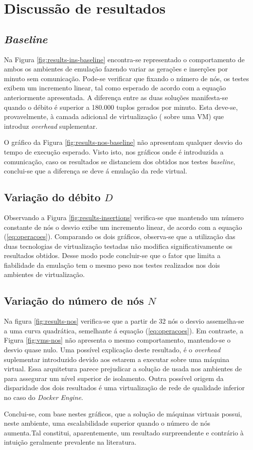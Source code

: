 
\section{Discussão de resultados}
\subsection{\emph{Baseline}}

Na Figura \ref{fig:results-ins-baseline} encontra-se representado o comportamento de ambos os ambientes de emulação fazendo variar as gerações e inserções por minuto sem comunicação. Pode-se verificar que fixando o número de nós, os testes exibem um incremento linear, tal como esperado de acordo com a equação anteriormente apresentada. A diferença entre as duas soluções manifesta-se quando o débito é superior a 180.000 tuplos gerados por minuto. Esta deve-se, provavelmente, à camada adicional de virtualização ({\conts} sobre uma VM) que introduz \textit{overhead} suplementar.

O gráfico da Figura \ref{fig:results-nos-baseline} não apresentam qualquer desvio do tempo de execução esperado. Visto isto, nos gráficos onde é introduzida a comunicação, caso os resultados se distanciem dos obtidos nos testes \textit{baseline}, conclui-se que a diferença se deve á emulação da rede virtual.

\subsection{Variação do débito $D$}

Observando a Figura \ref{fig:results-insertions} verifica-se que mantendo um número constante de nós o desvio exibe um incremento linear, de acordo com a equação (\ref{eq:operacoes}). Comparando os dois gráficos, observa-se que a utilização das duas tecnologias de virtualização testadas não modifica significativamente os resultados obtidos. Desse modo pode concluir-se que o fator que limita a fiabilidade da emulação tem o mesmo peso nos testes realizados nos dois ambientes de virtualização.

\subsection{Variação do número de nós $N$}

Na figura \ref{fig:results-nos} verifica-se que a partir de 32 nós o desvio assemelha-se a uma curva quadrática, semelhante á equação (\ref{eq:operacoes}). Em contraste, a Figura \ref{fig:vms-nos} não apresenta o mesmo comportamento, mantendo-se o desvio 
quase nulo. Uma possível explicação deste resultado, é o \textit{overhead} suplementar introduzido devido aos {\conts} estarem a executar sobre uma máquina virtual. Essa arquitetura parece prejudicar a solução de {\conts} usada nos ambientes de {\cloud} para assegurar um nível superior de isolamento. Outra possível origem da disparidade dos dois resultados é uma virtualização de rede de qualidade inferior no caso do \textit{Docker Engine}.

Conclui-se, com base nestes gráficos, que a solução de máquinas virtuais possui, neste ambiente, uma escalabilidade superior quando o número de nós aumenta.Tal constitui, aparentemente, um resultado surpreendente e contrário à intuição geralmente prevalente na literatura.